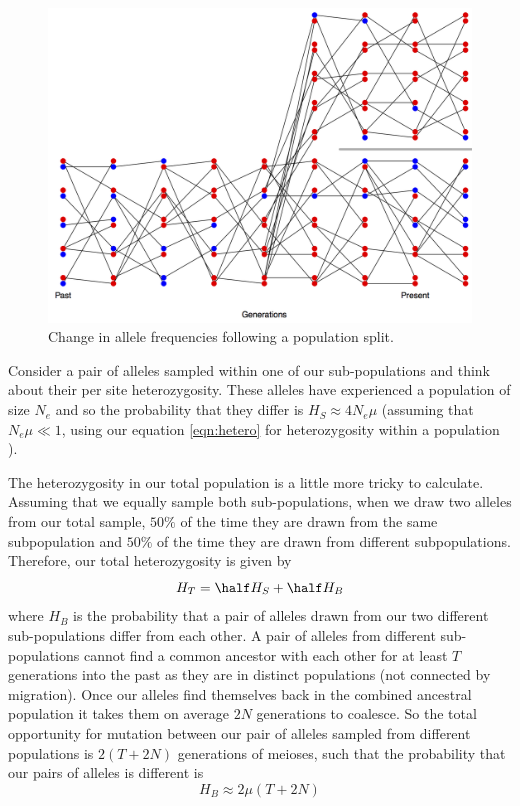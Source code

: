 \begin{figure}
\begin{center}
\includegraphics[width= 0.8 \textwidth]{figures/drift_split.png}
\end{center}
\caption{Change in allele frequencies following a population split. } \label{fig:drift_split}
\end{figure}

Consider a pair of alleles sampled within one of our
sub-populations and think about their per site heterozygosity.
These alleles have experienced a population of size $N_e$
and so the probability that they differ is $H_S \approx 4N_e \mu$ (assuming that $N_e \mu \ll 1$, using our equation  \ref{eqn:hetero} for heterozygosity within a population ).



The heterozygosity in our total population is a little more tricky to
calculate. Assuming that we equally sample both sub-populations, when we draw two alleles from our total
sample, $50\%$ of the time they are drawn from the same
subpopulation and $50\%$ of the time they are drawn from different
subpopulations. Therefore, our total heterozygosity is given by
\begin{equation}
H_T = \half H_S + \half H_B
\end{equation}
where $H_B$ is the probability that a pair of alleles drawn from our
two different sub-populations differ from each other. A pair of
alleles from different sub-populations cannot find a common ancestor with each other for at least $T$
generations into the past as they are in distinct populations (not
connected by migration). Once our alleles find themselves back in the combined ancestral
population it takes them on average $2N$ generations to coalesce. So the total opportunity for mutation between our pair of alleles sampled from different populations is $2 (T + 2N )$ generations of meioses, such that the probability that our pairs of alleles is different is
\begin{equation}
H_B \approx 2\mu ( T + 2 N) %
\end{equation}


